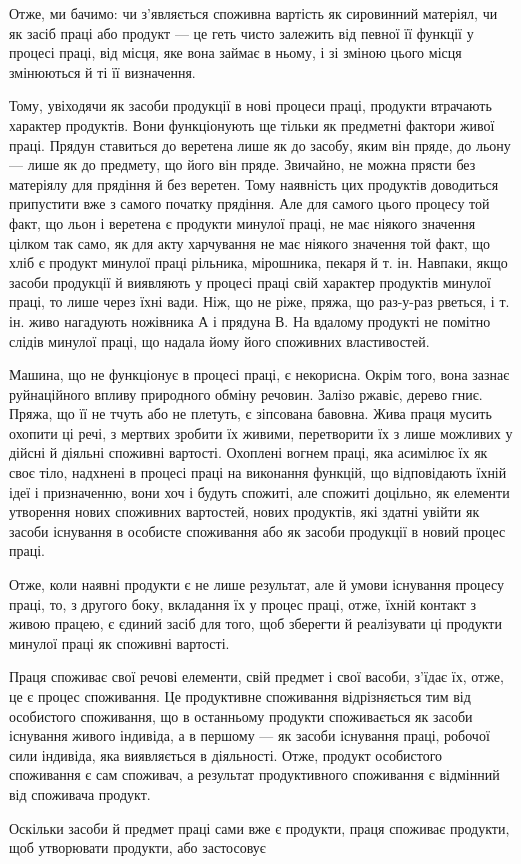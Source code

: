 Отже, ми бачимо: чи з’являється споживна вартість як сировинний
матеріял, чи як засіб праці або продукт — це геть чисто
залежить від певної її функції у процесі праці, від місця, яке
вона займає в ньому, і зі зміною цього місця змінюються й ті
її визначення.

Тому, увіходячи як засоби продукції в нові процеси праці,
продукти втрачають характер продуктів. Вони функціонують
ще тільки як предметні фактори живої праці. Прядун ставиться
до веретена лише як до засобу, яким він пряде, до льону — лише
як до предмету, що його він пряде. Звичайно, не можна прясти
без матеріялу для прядіння й без веретен. Тому наявність цих
продуктів доводиться припустити вже з самого початку прядіння.
Але для самого цього процесу той факт, що льон і веретена є
продукти минулої праці, не має ніякого значення цілком так
само, як для акту харчування не має ніякого значення той факт,
що хліб є продукт минулої праці рільника, мірошника, пекаря
й т. ін. Навпаки, якщо засоби продукції й виявляють у процесі
праці свій характер продуктів минулої праці, то лише через їхні
вади. Ніж, що не ріже, пряжа, що раз-у-раз рветься, і т. ін.
живо нагадують ножівника А і прядуна В. На вдалому продукті
не помітно слідів минулої праці, що надала йому його споживних
властивостей.

Машина, що не функціонує в процесі праці, є некорисна.
Окрім того, вона зазнає руйнаційного впливу природного обміну
речовин. Залізо ржавіє, дерево гниє. Пряжа, що її не тчуть або
не плетуть, є зіпсована бавовна. Жива праця мусить охопити
ці речі, з мертвих зробити їх живими, перетворити їх з лише
можливих у дійсні й діяльні споживні вартості. Охоплені вогнем
праці, яка асимілює їх як своє тіло, надхнені в процесі праці на виконання
функцій, що відповідають їхній ідеї і призначенню, вони
хоч і будуть спожиті, але спожиті доцільно, як елементи утворення
нових споживних вартостей, нових продуктів, які здатні
увійти як засоби існування в особисте споживання або як засоби
продукції в новий процес праці.

Отже, коли наявні продукти є не лише результат, але й умови
існування процесу праці, то, з другого боку, вкладання їх у
процес праці, отже, їхній контакт з живою працею, є єдиний
засіб для того, щоб зберегти й реалізувати ці продукти минулої
праці як споживні вартості.

Праця споживає свої речові елементи, свій предмет і свої
васоби, з’їдає їх, отже, це є процес споживання. Це продуктивне
споживання відрізняється тим від особистого споживання, що в
останньому продукти споживається як засоби існування живого
індивіда, а в першому — як засоби існування праці, робочої
сили індивіда, яка виявляється в діяльності. Отже, продукт особистого
споживання є сам споживач, а результат продуктивного
споживання є відмінний від споживача продукт.

Оскільки засоби й предмет праці сами вже є продукти, праця
споживає продукти, щоб утворювати продукти, або застосовує
\parbreak{}  %
